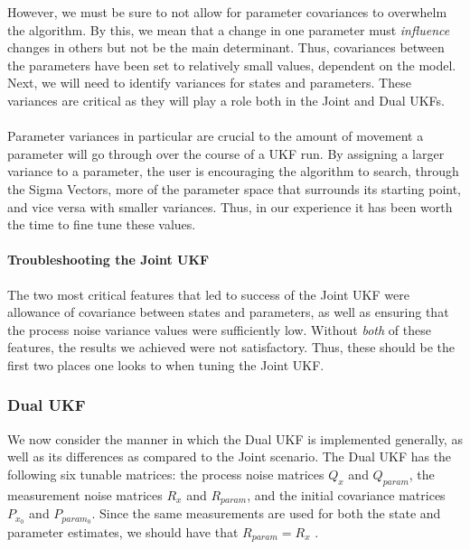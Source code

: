 However, we must be sure to not allow for parameter covariances to overwhelm the algorithm. By this, we mean that a change in one parameter must \emph{influence} changes in others but not be the main determinant. Thus, covariances between the parameters have been set to relatively small values, dependent on the model. Next, we will need to identify variances for states and parameters. These variances are critical as they will play a role both in the Joint and Dual UKFs.\\
\\
Parameter variances in particular are crucial to the amount of movement a parameter will go through over the course of a UKF run. By assigning a larger variance to a parameter, the user is encouraging the algorithm to search, through the Sigma Vectors, more of the parameter space that surrounds its starting point, and vice versa with smaller variances. Thus, in our experience it has been worth the time to fine tune these values.


\paragraph{Troubleshooting the Joint UKF}
The two most critical features that led to success of the Joint UKF were allowance of covariance between states and parameters, as well as ensuring that the process noise variance values were sufficiently low. Without \emph{both} of these features, the results we achieved were not satisfactory. Thus, these should be the first two places one looks to when tuning the Joint UKF.


\subsubsection{Dual UKF}
We now consider the manner in which the Dual UKF is implemented generally, as well as its differences as compared to the Joint scenario. The Dual UKF has the following six tunable matrices: the process noise matrices $Q_x$ and $Q_{param}$, the measurement noise matrices $R_x$ and $R_{param}$, and the initial covariance matrices $P_{x_0}$ and $P_{param_0}$. Since the same measurements are used for both the state and parameter estimates, we should have that $R_{param} = R_x$ \cite{GoveHollingerDual}.\\

